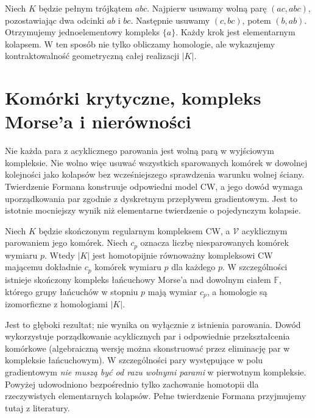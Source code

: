 \begin{przyklad}
Niech $K$ będzie pełnym trójkątem $abc$. Najpierw
usuwamy wolną parę $(ac,abc)$, pozostawiając dwa
odcinki $ab$ i $bc$. Następnie usuwamy
$(c,bc)$, potem $(b,ab)$. Otrzymujemy jednoelementowy
kompleks $\{a\}$. Każdy krok jest elementarnym
kolapsem. W ten sposób nie tylko obliczamy homologie,
ale wykazujemy kontraktowalność geometryczną całej
realizacji $|K|$.
\end{przyklad}

\section{Komórki krytyczne, kompleks Morse'a i nierówności}
\label{sec:tg-forman-inequalities}

\begin{uwaga}
Nie każda para z acyklicznego parowania jest wolną parą
w wyjściowym kompleksie. Nie wolno więc usuwać wszystkich
sparowanych komórek w dowolnej kolejności jako kolapsów
bez wcześniejszego sprawdzenia warunku wolnej ściany.
Twierdzenie Formana konstruuje odpowiedni model CW,
a jego dowód wymaga uporządkowania par zgodnie z dyskretnym
przepływem gradientowym. Jest to istotnie mocniejszy wynik
niż elementarne twierdzenie o pojedynczym kolapsie.
\end{uwaga}

\begin{twierdzenie}
\label{thm:tg-forman-main}
Niech $K$ będzie skończonym regularnym kompleksem CW,
a $\mathcal V$ acyklicznym parowaniem jego komórek.
Niech $c_p$ oznacza liczbę niesparowanych komórek
wymiaru $p$. Wtedy $|K|$ jest homotopijnie równoważny
kompleksowi CW mającemu dokładnie $c_p$ komórek
wymiaru $p$ dla każdego $p$.
W szczególności istnieje skończony kompleks łańcuchowy
Morse'a nad dowolnym ciałem $\mathbb F$, którego grupy łańcuchów
w stopniu $p$ mają wymiar $c_p$, a homologie są
izomorficzne z homologiami $|K|$.
\end{twierdzenie}

\begin{uwaga}
Jest to głęboki rezultat; nie wynika on wyłącznie z
istnienia parowania. Dowód wykorzystuje porządkowanie
acyklicznych par i odpowiednie przekształcenia komórkowe
(algebraiczną wersję można skonstruować przez eliminację
par w kompleksie łańcuchowym). W szczególności pary
występujące w polu gradientowym \emph{nie muszą być
od razu wolnymi parami} w pierwotnym kompleksie.
Powyżej udowodniono bezpośrednio tylko zachowanie
homotopii dla rzeczywistych elementarnych kolapsów.
Pełne twierdzenie Formana przyjmujemy tutaj z literatury.
\end{uwaga}

